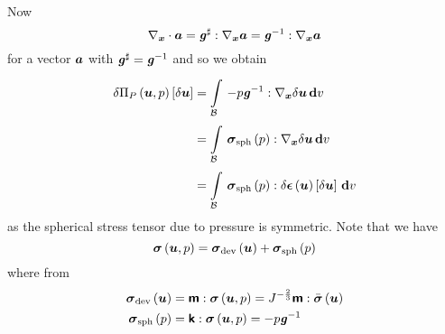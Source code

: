 Now
\begin{equation}
  \divergence{\vectr{x}}{\vectr{a}}=\doubledotprod{\sharptensor{\tensor{g}}}{\gradient{\vectr{x}}{\vectr{a}}}=\doubledotprod{\inverse{\tensor{g}}}{\gradient{\vectr{x}}{\covectr{a}}}
\end{equation}
for a vector $\boldsymbol{a}$ with
$ \boldsymbol{\mathit{g}}^{\sharp} ={\boldsymbol{\mathit{g}}}^{-1}$ and so we obtain
\begin{equation}
  \begin{split}
    \variation{\fnof{\Pi_{P}}{\vectr{u},p}}{\vectr{u}}&=\gint{\embedmanifold{B}}{}{\doubledotprod{-p\inverse{\tensor{g}}}{\gradient{\vectr{x}}{\variationdir{\vectr{u}}}}}{v}\\
    &=\gint{\embedmanifold{B}}{}{\doubledotprod{\fnof{\tensor{\sigma}_{\sphop}}{p}}{\gradient{\vectr{x}}{\variationdir{\vectr{u}}}}}{v} \\
    &=\gint{\embedmanifold{B}}{}{\doubledotprod{\fnof{\tensor{\sigma}_{\sphop}}{p}}{\variation{\fnof{\tensor{\epsilon}}{\vectr{u}}}{\vectr{u}}}}{v}
  \end{split}
\end{equation}
as the spherical stress tensor due to pressure is symmetric. Note that we have
\begin{equation}
   \boldsymbol{\mathit{\sigma}}\left( \boldsymbol{u},p \right) = \boldsymbol{\mathit{\sigma}}_{\operatorname{dev}}\left( \boldsymbol{u} \right) + \boldsymbol{\mathit{\sigma}}_{\operatorname{sph}}\left( p \right) 
\end{equation}
where from 
\begin{equation}
  \begin{split}
     \boldsymbol{\mathit{\sigma}}_{\operatorname{dev}}\left( \boldsymbol{u} \right) &= \boldsymbol{\mathsf{m}} :  \boldsymbol{\mathit{\sigma}}\left( \boldsymbol{u},p \right)  =J^{-\frac{2}{3}} \boldsymbol{\mathsf{m}} :  \bar{\boldsymbol{\mathit{\sigma}}}\left( \boldsymbol{u} \right)  \\
     \boldsymbol{\mathit{\sigma}}_{\operatorname{sph}}\left( p \right) &= \boldsymbol{\mathsf{k}} :  \boldsymbol{\mathit{\sigma}}\left( \boldsymbol{u},p \right)  =-p{\boldsymbol{\mathit{g}}}^{-1}
  \end{split}
\end{equation}

